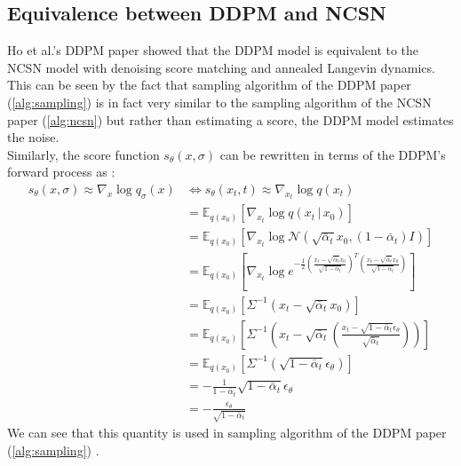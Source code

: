 \documentclass[twoside]{article}
\numberwithin{equation}{section}
\numberwithin{figure}{section}
\begin{document}
\subsection{Equivalence between DDPM and NCSN}
Ho et al.'s DDPM paper \cite{ho2020denoising} showed that the DDPM model is equivalent to the NCSN model with denoising score matching and annealed Langevin dynamics. \\
This can be seen by the fact that sampling algorithm of the DDPM paper (\ref{alg:sampling}) is in fact very similar to the sampling algorithm of the NCSN paper (\ref{alg:ncsn}) but rather than estimating a score, the DDPM model estimates the noise. \cite{ho2020denoising} \\
Similarly, the score function $s_\theta (x, \sigma)$ can be rewritten in terms of the DDPM's forward process as \cite{weng2021diffusion}:
{
  \allowdisplaybreaks
  \begin{align}
    s_\theta (x, \sigma) \approx \nabla_x \log q_\sigma (x) &\Leftrightarrow s_\theta (x_t, t) \approx \nabla_{x_t} \log q(x_t) \\
    &= \mathbb{E}_{q (x_0)} \left[ \nabla_{x_t} \log q(x_t \, | \, x_0) \right] \\
    &= \mathbb{E}_{q (x_0)} \left[ \nabla_{x_t} \log \mathcal{N} (\sqrt{\bar{\alpha}_t} x_0, (1 - \bar{\alpha}_t) I) \right] \\
    &= \mathbb{E}_{q (x_0)} \left[ \nabla_{x_t} \log e^{- \frac{1}{2} \left( \frac{x_t - \sqrt{\bar{\alpha}_t} x_0}{\sqrt{1 - \bar{\alpha}_t}} \right)^T \left( \frac{x_t - \sqrt{\bar{\alpha}_t} x_0}{\sqrt{1 - \bar{\alpha}_t}} \right)} \right] \\
    &= \mathbb{E}_{q (x_0)} \left[ \Sigma^{-1} (x_t - \sqrt{\bar{\alpha}_t} x_0) \right] \\
    &= \mathbb{E}_{q (x_0)} \left[ \Sigma^{-1} \left(x_t - \sqrt{\bar{\alpha}_t} \left( \frac{x_t - \sqrt{1 - \bar{\alpha}_t} \epsilon_\theta}{\sqrt{\bar{\alpha}_t}} \right) \right) \right] \\
    &= \mathbb{E}_{q (x_0)} \left[ \Sigma^{-1} \left( \sqrt{1 - \bar{\alpha}_t} \epsilon_\theta \right) \right] \\
    &= - \frac{1}{1 - \bar{\alpha}_t}  \sqrt{1 - \bar{\alpha}_t} \epsilon_\theta \\
    &= - \frac{\epsilon_\theta}{\sqrt{1 - \bar{\alpha}_t}}
  \end{align}
  We can see that this quantity is used in sampling algorithm of the DDPM paper (\ref{alg:sampling}) \cite{ho2020denoising}. 
}
\end{document}
